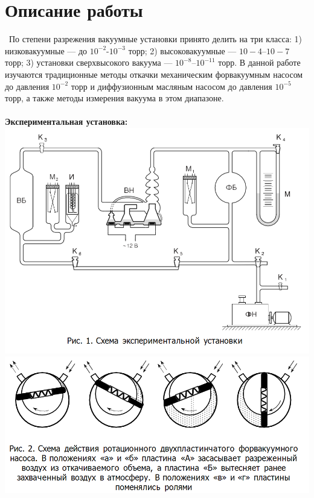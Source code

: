 \documentclass[11pt]{article}
\begin{document}
\section*{Описание работы}\
\indent По степени разрежения вакуумные установки принято делить на три класса: 1) низковакуумные — до $10^{−2}$-$10^{−3}$ торр; 2) высоковакуумные — $10−4$–$10−7$ торр; 3) установки сверхвысокого вакуума — $10^{−8}$–$10^{−11}$  торр. В данной работе изучаются   традиционные методы откачки механическим форвакуумным насосом до давления $10^{−2}$ торр и диффузионным масляным насосом до давления $10^{−5}$ торр, а также методы измерения вакуума в этом диапазоне.\\
\ \\
\textbf{Экспериментальная установка:}\\
\includegraphics[scale=0.8]{pic1.png}
\newpage
\includegraphics[scale=0.5]{pic2.png}
\end{document}
